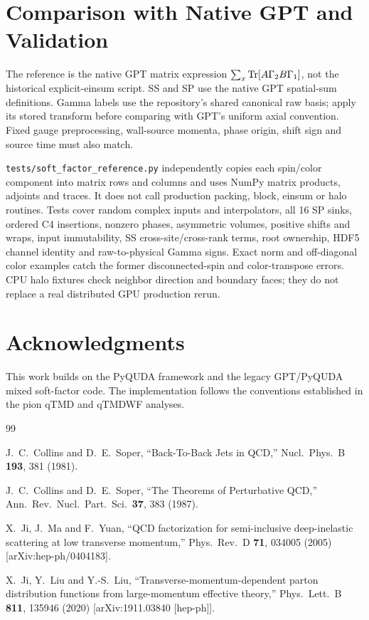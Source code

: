 \documentclass[11pt,a4paper]{article}
\newcommand{\walltag}[1]{\texttt{#1}}
\begin{document}
\section{Comparison with Native GPT and Validation}

The reference is the native GPT matrix expression
$\sum_x\Tr[A\Gamma_2B\Gamma_1]$, not the historical explicit-einsum script.
SS and SP use the native GPT spatial-sum definitions. Gamma labels use the
repository's shared canonical raw basis; apply its stored transform before
comparing with GPT's uniform axial convention. Fixed gauge preprocessing,
wall-source momenta, phase origin, shift sign and source time must also match.

\walltag{tests/soft\_factor\_reference.py} independently copies each
spin/color component into matrix rows and columns and uses NumPy matrix
products, adjoints and traces. It does not call production packing, block,
einsum or halo routines. Tests cover random complex inputs and interpolators,
all 16 SP sinks, ordered C4 insertions, nonzero phases, asymmetric volumes,
positive shifts and wraps, input immutability, SS cross-site/cross-rank terms,
root ownership, HDF5 channel identity and raw-to-physical Gamma signs.
Exact norm and off-diagonal color examples catch the former disconnected-spin
and color-transpose errors. CPU halo fixtures check neighbor direction and
boundary faces; they do not replace a real distributed GPU production rerun.


\section*{Acknowledgments}

This work builds on the PyQUDA framework and the legacy GPT/PyQUDA mixed
soft-factor code.  The implementation follows the conventions established
in the pion qTMD and qTMDWF analyses.

\begin{thebibliography}{99}

J.~C.~Collins and D.~E.~Soper,
``Back-To-Back Jets in QCD,''
Nucl.\ Phys.\ B \textbf{193}, 381 (1981).

J.~C.~Collins and D.~E.~Soper,
``The Theorems of Perturbative QCD,''
Ann.\ Rev.\ Nucl.\ Part.\ Sci.\ \textbf{37}, 383 (1987).

X.~Ji, J.~Ma and F.~Yuan,
``QCD factorization for semi-inclusive deep-inelastic scattering at low
transverse momentum,''
Phys.\ Rev.\ D \textbf{71}, 034005 (2005)
[arXiv:hep-ph/0404183].

X.~Ji, Y.~Liu and Y.-S.~Liu,
``Transverse-momentum-dependent parton distribution functions from
large-momentum effective theory,''
Phys.\ Lett.\ B \textbf{811}, 135946 (2020)
[arXiv:1911.03840 [hep-ph]].

\end{thebibliography}
\end{document}
